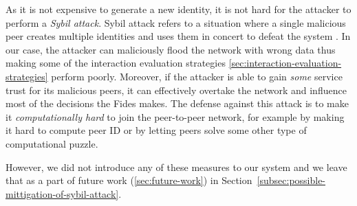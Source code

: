 As it is not expensive to generate a new identity, it is not hard for the attacker to perform a \textit{Sybil attack}.
Sybil attack refers to a situation where a single malicious peer creates multiple identities and uses them in concert to defeat the system \cite{sybil}.
In our case, the attacker can maliciously flood the network with wrong data thus making some of the interaction evaluation strategies \ref{sec:interaction-evaluation-strategies} perform poorly.
Moreover, if the attacker is able to gain \textit{some} service trust for its malicious peers, it can effectively overtake the network and influence most of the decisions the Fides makes.
The defense against this attack is to make it \textit{computationally hard} to join the peer-to-peer network, for example by making it hard to compute peer ID or by letting peers solve some other type of computational puzzle. 

However, we did not introduce any of these measures to our system and we leave that as a part of future work (\ref{sec:future-work}) in Section~\ref{subsec:possible-mittigation-of-sybil-attack}. 